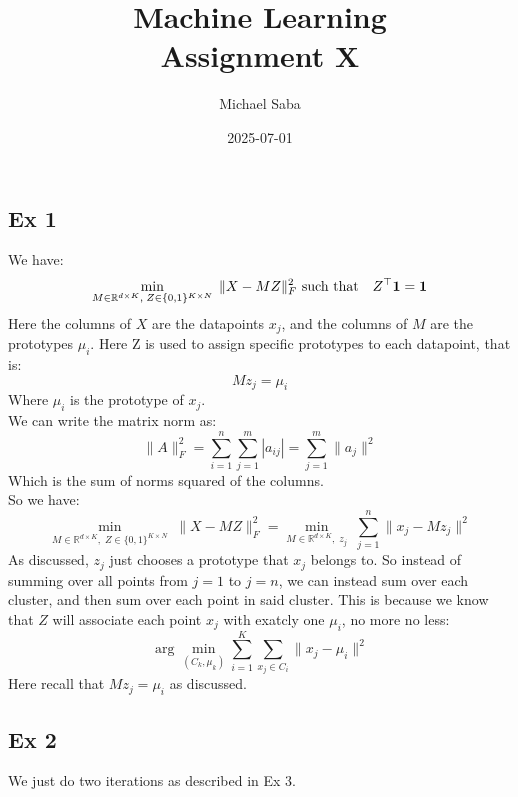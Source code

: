\documentclass[12pt]{article}
\title{
    \Huge Machine Learning \\
    \Large Assignment X
}
\date{2025-07-01}
\author{Michael Saba}
\begin{document}
\maketitle
\newpage
\setlength{\parindent}{0pt}

\subsection*{Ex 1}
We have:
\[ \min_{M \in \mathbb{R}^{d \times K},\; Z 
\in \{0,1\}^{K \times N}} \; \|X - MZ\|_F^2 \\
\text{ such that} 
\quad Z^\top \mathbf{1} = \mathbf{1} \]
Here the columns of $X$ are the datapoints $x_j$,
and the columns of $M$ are the prototypes $\mu_i$.
Here Z is used to assign specific prototypes
to each datapoint, that is:
\[ Mz_{j} = \mu_i \]
Where $\mu_i$ is the prototype of $x_j$. \\
We can write the matrix norm as:
\[ \|A\|^2_F = \sum_{i= 1}^{n}\sum_{j=1}^{m} |a_{ij}|
= \sum_{j=1}^{m} \| a_{j} \|^2 \]
Which is the sum of norms squared of the columns. \\
So we have:
\[ \min_{M \in \mathbb{R}^{d \times K},\; Z 
\in \{0,1\}^{K \times N}} \; \|X - MZ\|_F^2 
= \min_{M \in \mathbb{R}^{d \times K},\; z_j} \;
\sum_{j=1}^{n} \| x_{j} - Mz_j \|^2 \]
As discussed, $z_j$ just chooses a prototype that
$x_j$ belongs to.
So instead of summing over all points
from $j = 1$ to $j = n$, we can instead
sum over each cluster, and then sum over each
point in said cluster. This is because we know
that $Z$ will associate each point $x_j$
with exatcly one $\mu_i$, no more no less:
\[ \arg \min_{(C_k, \mu_k)} \sum_{i=1}^K \sum_{x_j \in C_i}
\|x_j - \mu_i\|^2 \]
Here recall that $Mz_j = \mu_i$ as discussed. \\


\newpage

\subsection*{Ex 2}

We just do two iterations as described in Ex 3. \\

\end{document}
